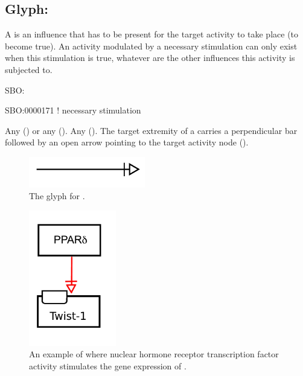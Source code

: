 \subsection{Glyph: }
\label{sec:af:trigger}
A  is an influence that has to be present for the target activity to take place (to become true).  An activity modulated by a necessary stimulation can only exist when this stimulation is true, whatever are the other influences this activity is subjected to.

\begin{glyphDescription}

\glyphSboTerm SBO:

SBO:0000171 ! necessary stimulation

 \glyphOrigin Any  () or any  ().
 \glyphTarget Any  ().
 \glyphEndPoint The target extremity of a  carries a perpendicular bar followed by an open arrow pointing to the target activity node ().


\end{glyphDescription}

\begin{figure}[H]
  \centering
  \includegraphics[width = 2in]{images/necessaryStimulation}
  \caption{The \AF glyph for .}
  \label{fig:af:trigger}
\end{figure}

\begin{figure}[H]
  \centering
  \includegraphics[width = 1.5in]{examples/ex-necessaryStimulation}
  \caption{An example of  where nuclear hormone receptor  transcription factor activity stimulates the gene expression of . }
  \label{fig:af:ex-NS}
\end{figure}
